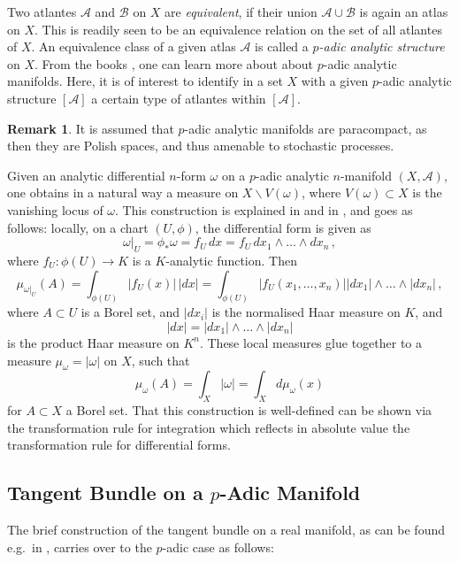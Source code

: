 \documentclass[a4paper,draft]{ZbRad}
\theoremstyle{plain}
\theoremstyle{definition}
\newtheorem{rem}{Remark}[section]
\numberwithin{equation}{section}
\renewcommand{\setminus}{\smallsetminus}
\newcommand{\absolute}[1]{\left\lvert#1\right\rvert}
\begin{document}
Two atlantes $\mathcal{A}$ and $\mathcal{B}$ on $X$ are \emph{equivalent}, if their union $\mathcal{A}\cup\mathcal{B}$ is again
an atlas on $X$. This is readily seen to be an equivalence relation on the set of
all atlantes of $X$. An equivalence class of a given atlas $\mathcal{A}$ is called a \emph{$p$-adic
analytic structure} on $X$. From the books \cite{Schneider2011,Serre1992}, one can learn more about about
$p$-adic analytic manifolds. Here, it is of interest to identify in a set $X$ with a
given $p$-adic analytic structure $[\mathcal{A}]$ a certain type of atlantes within $[\mathcal{A}]$.


\begin{rem}
It is assumed that $p$-adic analytic manifolds are paracompact, as then they are Polish spaces, and thus amenable to stochastic processes.
\end{rem}

Given an analytic differential $n$-form $\omega$ on a $p$-adic analytic $n$-manifold $(X,\mathcal{A})$, one obtains in a natural way a measure on $X\setminus V(\omega)$, where $V(\omega)\subset X$ is the vanishing locus of $\omega$. This construction is explained in \cite[Chapter 7.4]{Igusa2002} and in \cite[Chapter 2.2]{Weil1982}, and goes as follows: locally, on a chart $(U,\phi)$, the differential form is given as
\[
\omega|_U=\phi_*\omega=f_U\,dx=f_U\,dx_1\wedge\dots\wedge dx_n\,,
\]
where $f_U\colon \phi(U)\to K$ is a $K$-analytic function. Then
\[
\mu_{\omega|_U}(A)=\int_{\phi(U)}\absolute{f_U(x)}\,\absolute{dx}=\int_{\phi(U)}\absolute{f_U(x_1,\dots,x_n)}\absolute{dx_1}\wedge\dots\wedge\absolute{dx_n}\,,
\]
where $A\subset U$ is a Borel set, and 
$\absolute{dx_i}$ is the normalised Haar measure on $K$, and
\[
\absolute{dx}=\absolute{dx_1}\wedge\dots\wedge\absolute{dx_n}
\]
is the product Haar measure on $K^n$. These local measures glue together to a measure $\mu_\omega=\absolute{\omega}$ on $X$, such that
\[
\mu_\omega(A)=\int_X\absolute{\omega}=\int_{X}d\mu_\omega(x)
\]
for $A\subset X$ a Borel set. That this construction is well-defined can be shown via the transformation rule for integration which reflects in absolute value the transformation rule for differential forms.

\subsection{Tangent Bundle on a $p$-Adic Manifold}

The brief construction of the tangent bundle on a real manifold, as can be found e.g.\ in \cite[Chapter 1.1]{Taira1998}, carries over to the $p$-adic case as follows:
\newline
\end{document}
